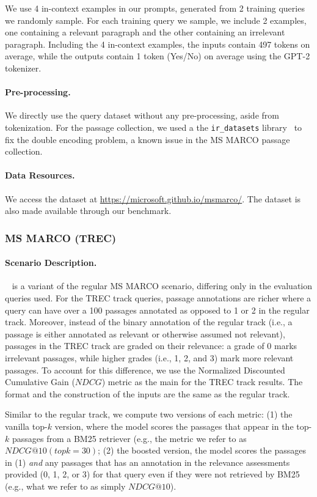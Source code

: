 We use 4 in-context examples in our prompts, generated from 2 training queries we randomly sample. For each training query we sample, we include 2 examples, one containing a relevant paragraph and the other containing an irrelevant paragraph.
Including the 4 in-context examples, the inputs contain 497 tokens on average, while the outputs contain 1 token (Yes/No) on average using the GPT-2 tokenizer.

\paragraph{Pre-processing.}
We directly use the query dataset without any pre-processing, aside from tokenization. For the passage collection, we used a the \texttt{ir\_datasets} library~\citep{macavaney:sigir2021-irds} to fix the double encoding problem, a known issue in the MS MARCO passage collection.

\paragraph{Data Resources.}
We access the dataset at \url{https://microsoft.github.io/msmarco/}. The dataset is also made available through our benchmark.

\subsubsection{MS MARCO (TREC)}
\paragraph{Scenario Description.}
\msmarcotrec~\citep{craswell2020overview} is a variant of the regular MS MARCO scenario, differing only in the evaluation queries used.
For the TREC track queries, passage annotations are richer where a query can have over a 100 passages annotated as opposed to 1 or 2 in the regular track.
Moreover, instead of the binary annotation of the regular track (i.e., a passage is either annotated as relevant or otherwise assumed not relevant), passages in the TREC track are graded on their relevance: a grade of 0 marks irrelevant passages, while higher grades (i.e., 1, 2, and 3) mark more relevant passages.
To account for this difference, we use the Normalized Discounted Cumulative Gain ($NDCG$) metric as the main for the TREC track results.
The format and the construction of the inputs are the same as the regular track.

Similar to the regular track, we compute two versions of each metric: (1) the vanilla top-$k$ version, where the model scores the passages that appear in the top-$k$ passages from a BM25 retriever (e.g., the metric we refer to as $NDCG@10 (topk=30)$; (2) the boosted version, the model scores the passages in (1) \textit{and} any passages that has an annotation in the relevance assessments provided (0, 1, 2, or 3) for that query even if they were not retrieved by BM25 (e.g., what we refer to as simply $NDCG@10$).

